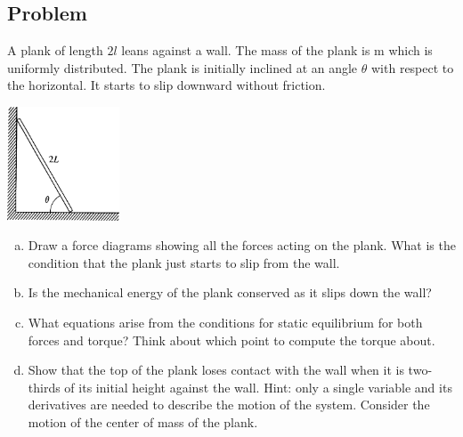 \documentclass[solutions]{esg8012pset}
\begin{document}
\subsection{Problem}
  A plank of length $2 l$ leans against a wall. The mass of the plank is m which is uniformly distributed. The plank is initially inclined at an angle $\theta$ with respect to the horizontal. It starts to slip downward without friction.
  \begin{center}\includegraphics[width=0.25\textwidth]{ps09_7}\end{center}
  \begin{enumerate}[(a)]
    \item Draw a force diagrams showing all the forces acting on the plank. What is the condition that the plank just starts to slip from the wall.
    \item Is the mechanical energy of the plank conserved as it slips down the wall?
    \item What equations arise from the conditions for static equilibrium for both forces and torque? Think about which point to compute the torque about.
    \item Show that the top of the plank loses contact with the wall when it is two-thirds of its initial height against the wall. Hint: only a single variable and its derivatives are needed to describe the motion of the system. Consider the motion of the center of mass of the plank.
  \end{enumerate}
\end{document}
